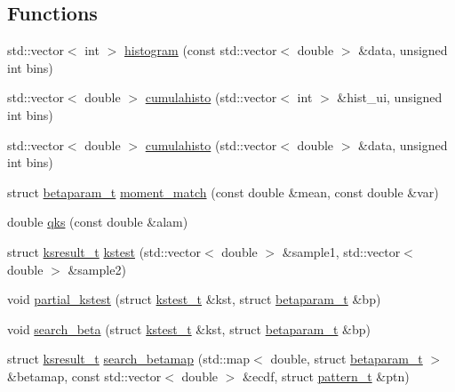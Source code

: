\subsection*{Functions}
\begin{DoxyCompactItemize}
\item 
std\+::vector$<$ int $>$ \hyperlink{namespaceclassprobability_1_1beta_a558685882277ce2e1a1e33de4e2182a0}{histogram} (const std\+::vector$<$ double $>$ \&data, unsigned int bins)
\item 
std\+::vector$<$ double $>$ \hyperlink{namespaceclassprobability_1_1beta_a382d63f712d6b3b11974a6186f1bb3df}{cumulahisto} (std\+::vector$<$ int $>$ \&hist\+\_\+ui, unsigned int bins)
\item 
std\+::vector$<$ double $>$ \hyperlink{namespaceclassprobability_1_1beta_a8377119dc967001dffeb9509b27fdccb}{cumulahisto} (std\+::vector$<$ double $>$ \&data, unsigned int bins)
\item 
struct \hyperlink{structclassprobability_1_1beta_1_1betaparam__t}{betaparam\+\_\+t} \hyperlink{namespaceclassprobability_1_1beta_a07fdac1b03623996c1ab07204deb264e}{moment\+\_\+match} (const double \&mean, const double \&var)
\item 
double \hyperlink{namespaceclassprobability_1_1beta_a1d58f45fa51123cd06a570eb5018a14d}{qks} (const double \&alam)
\item 
struct \hyperlink{structclassprobability_1_1beta_1_1ksresult__t}{ksresult\+\_\+t} \hyperlink{namespaceclassprobability_1_1beta_a5bb6d1e4185aea957082b94a7c7753a0}{kstest} (std\+::vector$<$ double $>$ \&sample1, std\+::vector$<$ double $>$ \&sample2)
\item 
void \hyperlink{namespaceclassprobability_1_1beta_a7c2ac66aceb8ffb9c2322d4022cac726}{partial\+\_\+kstest} (struct \hyperlink{structclassprobability_1_1beta_1_1kstest__t}{kstest\+\_\+t} \&kst, struct \hyperlink{structclassprobability_1_1beta_1_1betaparam__t}{betaparam\+\_\+t} \&bp)
\item 
void \hyperlink{namespaceclassprobability_1_1beta_a6f929da0f33eabbde20f18f841bedb34}{search\+\_\+beta} (struct \hyperlink{structclassprobability_1_1beta_1_1kstest__t}{kstest\+\_\+t} \&kst, struct \hyperlink{structclassprobability_1_1beta_1_1betaparam__t}{betaparam\+\_\+t} \&bp)
\item 
struct \hyperlink{structclassprobability_1_1beta_1_1ksresult__t}{ksresult\+\_\+t} \hyperlink{namespaceclassprobability_1_1beta_a0dd63abba495577f7e854743c6b78e66}{search\+\_\+betamap} (std\+::map$<$ double, struct \hyperlink{structclassprobability_1_1beta_1_1betaparam__t}{betaparam\+\_\+t} $>$ \&betamap, const std\+::vector$<$ double $>$ \&ecdf, struct \hyperlink{structclassprobability_1_1pattern__t}{pattern\+\_\+t} \&ptn)
\end{DoxyCompactItemize}


